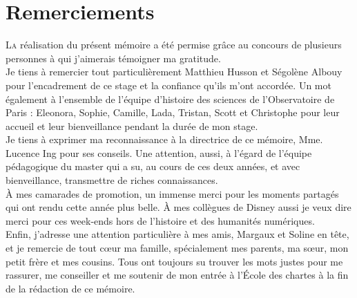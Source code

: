 \chapter{Remerciements}
	\lettrine{L}a réalisation du présent mémoire a été permise grâce au concours de plusieurs personnes à qui j’aimerais témoigner ma gratitude. \\
	
	Je tiens à remercier tout particulièrement Matthieu Husson et Ségolène Albouy pour l’encadrement de ce stage et la confiance qu'ils m'ont accordée. Un mot également à l’ensemble de l’équipe d'histoire des sciences de l'Observatoire de Paris : Eleonora, Sophie, Camille, Lada, Tristan, Scott et Christophe pour leur accueil et leur bienveillance pendant la durée de mon stage. \\
	
	Je tiens à exprimer ma reconnaissance à la directrice de ce mémoire, Mme. Lucence Ing pour ses conseils. Une attention, aussi, à l'égard de l'équipe pédagogique du master qui a su, au cours de ces deux années, et avec bienveillance, transmettre de riches connaissances. \\
	
	À mes camarades de promotion, un immense merci pour les moments partagés qui ont rendu cette année plus belle. À mes collègues de Disney aussi je veux dire merci pour ces week-ends hors de l'histoire et des humanités numériques.\\
	
	Enfin, j’adresse une attention particulière à mes amis, Margaux et Soline en tête, et je remercie de tout cœur ma famille, spécialement mes parents, ma sœur, mon petit frère et mes cousins. Tous ont toujours su trouver les mots justes pour me rassurer, me conseiller et me soutenir de mon entrée à l'École des chartes à la fin de la rédaction de ce mémoire.
 